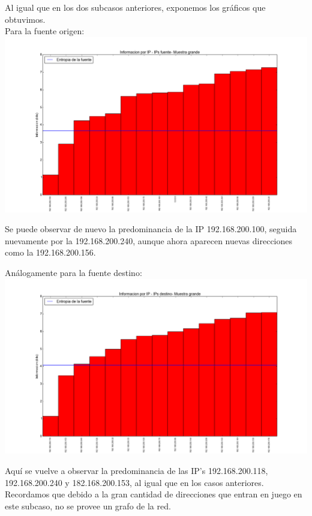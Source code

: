 \indent \indent Al igual que en los dos subcasos anteriores, exponemos los gráficos que obtuvimos.\\
\indent Para la fuente origen:\\


\includegraphics[scale=0.5,clip=true,trim=100 0 0 0]{graphics/laburo_grande_src.png}

\indent Se puede observar de nuevo la predominancia de la IP 192.168.200.100, seguida nuevamente por la 192.168.200.240, aunque ahora aparecen nuevas direcciones como la 192.168.200.156.

\indent Análogamente para la fuente destino:\\

\includegraphics[scale=0.5,clip=true,trim=100 0 0 0]{graphics/laburo_grande_dst.png}


\indent Aquí se vuelve a observar la predominancia de las IP's 192.168.200.118, 192.168.200.240 y 182.168.200.153, al igual que en los casos anteriores.\\

\indent Recordamos que debido a la gran cantidad de direcciones que entran en juego en este subcaso, no se provee un grafo de la red.\\


